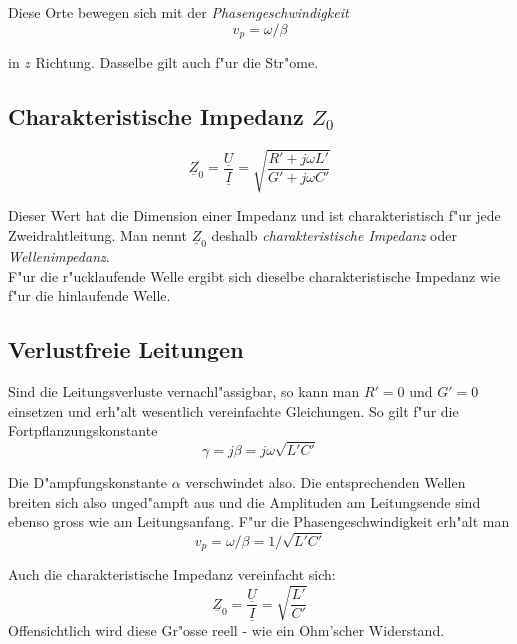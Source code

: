 \documentclass[german, 10pt, a4paper, headsepline]{scrreprt}
\theoremstyle{remark}
\begin{document}
Diese Orte bewegen sich mit der \textit{Phasengeschwindigkeit}
\begin{displaymath}
	v_p = \omega / \beta
\end{displaymath}

in $z$ Richtung. Dasselbe gilt auch f"ur die Str"ome.

\subsection{Charakteristische Impedanz $Z_0$}

\begin{displaymath}
	\underline{Z}_0 = \frac{\underline{U}}{\underline{I}} = \sqrt{\frac{R' + j\omega L'}{G' + j\omega C'}}
\end{displaymath}

Dieser Wert hat die Dimension einer Impedanz und ist charakteristisch f"ur jede Zweidrahtleitung. Man nennt $\underline{Z}_0$ deshalb \textit{charakteristische Impedanz} oder \textit{Wellenimpedanz}.\\
F"ur die r"ucklaufende Welle ergibt sich dieselbe charakteristische Impedanz wie f"ur die hinlaufende Welle.

\subsection{Verlustfreie Leitungen}

Sind die Leitungsverluste vernachl"assigbar, so kann man $R' = 0$ und $G' = 0$ einsetzen und erh"alt wesentlich vereinfachte Gleichungen. So gilt f"ur die Fortpflanzungskonstante
\begin{displaymath}
	\gamma = j\beta = j\omega \sqrt{L' C'}
\end{displaymath}

Die D"ampfungskonstante $\alpha$ verschwindet also. Die entsprechenden Wellen breiten sich also unged"ampft aus und die Amplituden am Leitungsende sind ebenso gross wie am Leitungsanfang. F"ur die Phasengeschwindigkeit erh"alt man
\begin{displaymath}
	v_p = \omega / \beta = 1 / \sqrt{L'C'}
\end{displaymath}

Auch die charakteristische Impedanz vereinfacht sich:
\begin{displaymath}
	\underline{Z}_0 = \frac{\underline{U}}{\underline{I}} = \sqrt{\frac{L'}{C'}}
\end{displaymath}
Offensichtlich wird diese Gr"osse reell - wie ein Ohm'scher Widerstand.
\end{document}
